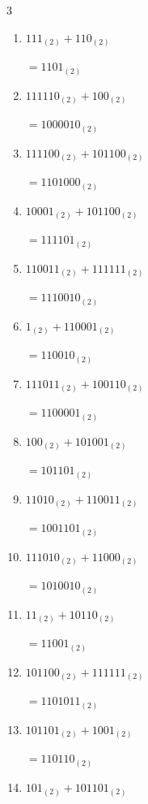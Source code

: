 \begin{multicols}{3}
\begin{enumerate}
        $=1001000_{(2)}$

  \item $111_{(2)} + 110_{(2)}$

        $=1101_{(2)}$

  \item $111110_{(2)} + 100_{(2)}$

        $=1000010_{(2)}$

  \item $111100_{(2)} + 101100_{(2)}$

        $=1101000_{(2)}$

  \item $10001_{(2)} + 101100_{(2)}$

        $=111101_{(2)}$

  \item $110011_{(2)} + 111111_{(2)}$

        $=1110010_{(2)}$

  \item $1_{(2)} + 110001_{(2)}$

        $=110010_{(2)}$

  \item $111011_{(2)} + 100110_{(2)}$

        $=1100001_{(2)}$

  \item $100_{(2)} + 101001_{(2)}$

        $=101101_{(2)}$

  \item $11010_{(2)} + 110011_{(2)}$

        $=1001101_{(2)}$

\columnbreak %

\resetques

  \item $111010_{(2)} + 11000_{(2)}$

        $=1010010_{(2)}$

  \item $11_{(2)} + 10110_{(2)}$

        $=11001_{(2)}$

  \item $101100_{(2)} + 111111_{(2)}$

        $=1101011_{(2)}$

  \item $101101_{(2)} + 1001_{(2)}$

        $=110110_{(2)}$

  \item $101_{(2)} + 101101_{(2)}$


\end{enumerate}
\end{multicols}
